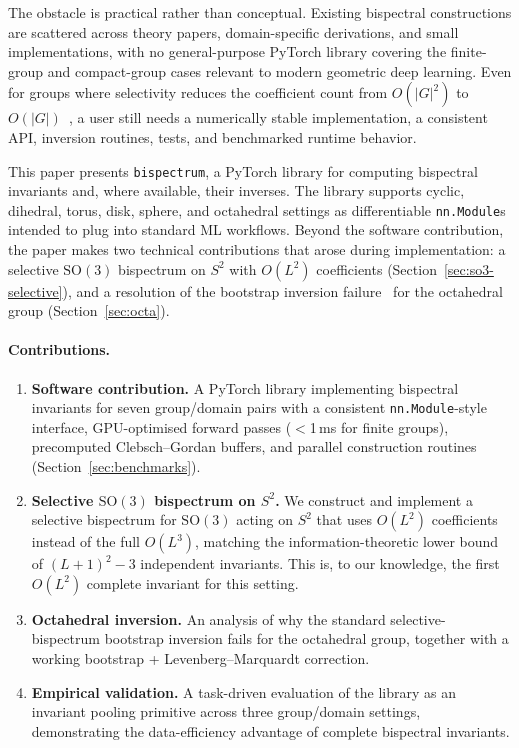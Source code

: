 \documentclass{article}
\newcommand{\SO}{\mathrm{SO}}
\begin{document}
The obstacle is practical rather than conceptual. Existing bispectral
constructions are scattered across theory papers, domain-specific derivations,
and small implementations, with no general-purpose PyTorch library covering the
finite-group and compact-group cases relevant to modern geometric deep learning.
Even for groups where selectivity reduces the coefficient count from
$O(|G|^2)$ to $O(|G|)$~\citep{mataigne2024selective}, a user still needs a numerically stable implementation,
a consistent API, inversion routines, tests, and benchmarked runtime behavior.

This paper presents \texttt{bispectrum}, a PyTorch library for computing
bispectral invariants and, where available, their inverses. The library
supports cyclic, dihedral, torus, disk, sphere, and octahedral settings as
differentiable \texttt{nn.Module}s intended to plug into standard ML workflows.
Beyond the software contribution, the paper makes two technical contributions
that arose during implementation: a selective $\SO(3)$ bispectrum on $S^2$
with $O(L^2)$ coefficients (Section~\ref{sec:so3-selective}), and a resolution of
the bootstrap inversion failure~\citep{mataigne2024selective} for the
octahedral group (Section~\ref{sec:octa}).

\paragraph{Contributions.}
\begin{enumerate}
  \item \textbf{Software contribution.} A PyTorch library implementing
    bispectral invariants for seven group/domain pairs with a consistent
    \texttt{nn.Module}-style interface, GPU-optimised forward passes
    ($<$1\,ms for finite groups), precomputed Clebsch--Gordan buffers,
    and parallel construction routines
    (Section~\ref{sec:benchmarks}).
  \item \textbf{Selective $\SO(3)$ bispectrum on $S^2$.} We construct and
    implement a selective bispectrum for $\SO(3)$ acting on $S^2$ that uses
    $O(L^2)$ coefficients instead of the full $O(L^3)$, matching the
    information-theoretic lower bound of $(L{+}1)^2 - 3$ independent
    invariants. This is, to our knowledge, the first $O(L^2)$ complete
    invariant for this setting.
  \item \textbf{Octahedral inversion.} An analysis of why the standard
    selective-bispectrum bootstrap inversion fails for the octahedral group,
    together with a working bootstrap + Levenberg--Marquardt correction.
  \item \textbf{Empirical validation.} A task-driven evaluation of the
    library as an invariant pooling primitive across three group/domain
    settings, demonstrating the data-efficiency advantage of complete
    bispectral invariants.
\end{enumerate}
\end{document}
